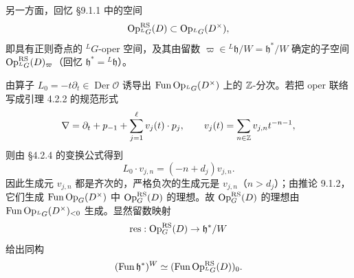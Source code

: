 另一方面，回忆 §9.1.1 中的空间
\[
    \operatorname{Op}^{\mathrm{RS}}_{{}^LG}(D)\subset\operatorname{Op}_{{}^LG}(D^\times),
\]
即具有正则奇点的 ${}^LG$-oper 空间，及其由留数 $\varpi\in{}^L\mathfrak{h}/W=\mathfrak{h}^*/W$ 确定的子空间 $\operatorname{Op}^{\mathrm{RS}}_{{}^LG}(D)_\varpi$（回忆 $\mathfrak{h}^*={}^L\mathfrak{h}$）。


由算子 $L_0=-t\partial_t\in\operatorname{Der}\mathcal{O}$ 诱导出 $\operatorname{Fun}\operatorname{Op}_{{}^LG}(D^\times)$ 上的 $\mathbb{Z}$-分次。若把 oper 联络写成引理 4.2.2 的规范形式
\[
    \nabla=\partial_t+p_{-1}+\sum_{j=1}^{\ell}v_j(t)\cdot p_j,
    \qquad
    v_j(t)=\sum_{n\in\mathbb{Z}}v_{j,n}t^{-n-1},
\]
则由 §4.2.4 的变换公式得到
\[
    L_0\cdot v_{j,n}=(-n+d_j)v_{j,n}.
\]
因此生成元 $v_{j,n}$ 都是齐次的，严格负次的生成元是 $v_{j,n}$（$n>d_j$）；由推论 9.1.2，它们生成 $\operatorname{Fun}\operatorname{Op}_G(D^\times)$ 中 $\operatorname{Op}^{\mathrm{RS}}_G(D)$ 的理想。故 $\operatorname{Op}^{\mathrm{RS}}_G(D)$ 的理想由 $\operatorname{Fun}\operatorname{Op}_{{}^LG}(D^\times)_{<0}$ 生成。显然留数映射
\[
    \operatorname{res}:\operatorname{Op}^{\mathrm{RS}}_G(D)\to\mathfrak{h}^*/W
\]
给出同构
\[
    (\operatorname{Fun}\mathfrak{h}^*)^W\simeq(\operatorname{Fun}\operatorname{Op}^{\mathrm{RS}}_{{}^LG}(D))_0 .
\]

